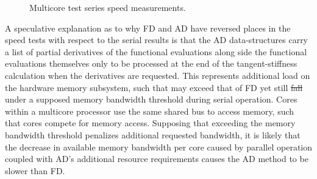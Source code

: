 \documentclass[preprint,12pt]{elsarticle}
\providecommand{\DIFaddtex}[1]{{\protect\color{blue}\uwave{#1}}} %
\providecommand{\DIFdeltex}[1]{{\protect\color{red}\sout{#1}}}                      %
\providecommand{\DIFaddbegin}{} %
\providecommand{\DIFaddend}{} %
\providecommand{\DIFdelbegin}{} %
\providecommand{\DIFdelend}{} %
\providecommand{\DIFaddbeginFL}{} %
\providecommand{\DIFaddendFL}{} %
\providecommand{\DIFdelbeginFL}{} %
\providecommand{\DIFdelendFL}{} %
\providecommand{\DIFadd}[1]{\texorpdfstring{\DIFaddtex{#1}}{#1}} %
\providecommand{\DIFdel}[1]{\texorpdfstring{\DIFdeltex{#1}}{}} %
\begin{document}
%
\begin{figure}[tbp] 
    \centering 
    \DIFdelbeginFL %
\DIFdelendFL \DIFaddbeginFL \scalebox{1.1}{}
    \DIFaddendFL \caption{Multicore test series speed measurements.} 
    \label{fig:multi_speed}
\end{figure}
%
A speculative explanation as to why FD and AD have reversed places in the speed tests with respect to the serial results is that the AD data-structures carry a list of partial derivatives of the functional evaluations along side the functional evaluations themselves only to be processed at the end of the tangent-stiffness \DIFaddbegin \DIFadd{matrix }\DIFaddend calculation when the derivatives are requested. This represents additional load on the hardware memory subsystem, such that may exceed that of FD yet still \DIFdelbegin \DIFdel{fall }\DIFdelend \DIFaddbegin \DIFadd{falls }\DIFaddend under a supposed memory bandwidth threshold during serial operation. Cores within a multicore processor use the same shared bus to access memory, such that cores compete for memory access. Supposing that exceeding the memory bandwidth threshold penalizes additional requested bandwidth, it is likely that the decrease in available memory bandwidth per core caused by parallel operation coupled with AD's additional resource requirements causes the AD method to be slower than FD. 
\end{document}
